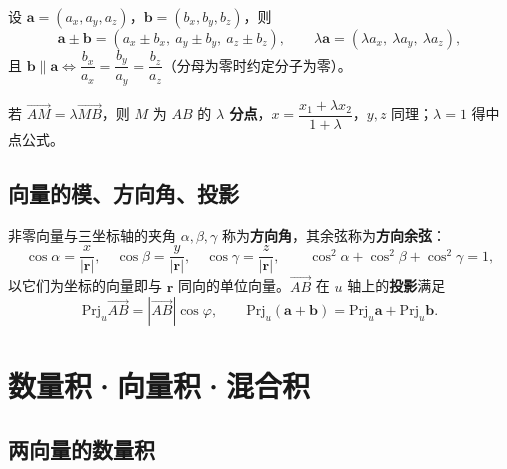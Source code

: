 设 $\boldsymbol a=(a_x,a_y,a_z)$，$\boldsymbol b=(b_x,b_y,b_z)$，则
\begin{equation}
\boldsymbol a\pm\boldsymbol b=(a_x\pm b_x,\ a_y\pm b_y,\ a_z\pm b_z),\qquad
\lambda\boldsymbol a=(\lambda a_x,\ \lambda a_y,\ \lambda a_z),
\end{equation}
且 $\boldsymbol b\parallel\boldsymbol a\iff\dfrac{b_x}{a_x}=\dfrac{b_y}{a_y}=\dfrac{b_z}{a_z}$（分母为零时约定分子为零）。


若 $\overrightarrow{AM}=\lambda\overrightarrow{MB}$，则 $M$ 为 $AB$ 的 \textbf{$\lambda$ 分点}，$x=\dfrac{x_1+\lambda x_2}{1+\lambda}$，$y,z$ 同理；$\lambda=1$ 得中点公式。

\subsection{向量的模、方向角、投影}


非零向量与三坐标轴的夹角 $\alpha,\beta,\gamma$ 称为\textbf{方向角}，其余弦称为\textbf{方向余弦}：
\begin{equation}
\cos\alpha=\frac{x}{|\boldsymbol r|},\quad \cos\beta=\frac{y}{|\boldsymbol r|},\quad \cos\gamma=\frac{z}{|\boldsymbol r|},\qquad
\cos^{2}\alpha+\cos^{2}\beta+\cos^{2}\gamma=1 ,
\end{equation}
以它们为坐标的向量即与 $\boldsymbol r$ 同向的单位向量。$\overrightarrow{AB}$ 在 $u$ 轴上的\textbf{投影}满足
\begin{equation}
\mathrm{Prj}_u\overrightarrow{AB}=|\overrightarrow{AB}|\cos\varphi,\qquad
\mathrm{Prj}_u(\boldsymbol a+\boldsymbol b)=\mathrm{Prj}_u\boldsymbol a+\mathrm{Prj}_u\boldsymbol b .
\end{equation}


\section{数量积·向量积·混合积}

\subsection{两向量的数量积}

